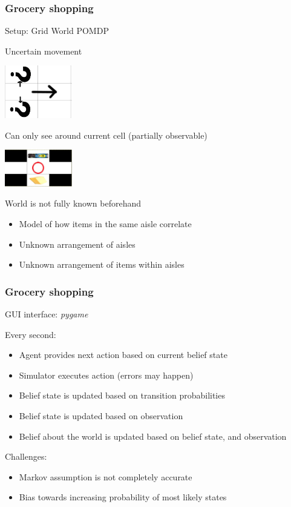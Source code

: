 \documentclass[10pt, compress]{beamer}
\begin{document}
\begin{frame}[fragile]
  \frametitle{Grocery shopping}

  Setup: Grid World POMDP

  Uncertain movement

  \centerline{\includegraphics[width=0.22\textwidth]{img/uncertain_transition.png}}

  Can only see around current cell (partially observable)

  \centerline{\includegraphics[width=0.22\textwidth]{img/partial_obs.png}}

  World is not fully known beforehand
  \begin{itemize}
  \item Model of how items in the same aisle correlate
  \item Unknown arrangement of aisles
  \item Unknown arrangement of items within aisles
  \end{itemize}
\end{frame}

\begin{frame}[fragile]
  \frametitle{Grocery shopping}

  GUI interface: {\it pygame}

  Every second:
  \begin{itemize}
  \item Agent provides next action based on current belief state
  \item Simulator executes action (errors may happen)
  \item Belief state is updated based on transition probabilities
  \item Belief state is updated based on observation
  \item Belief about the world is updated based on belief state, and observation
  \end{itemize}

  Challenges:
  \begin{itemize}
  \item Markov assumption is not completely accurate
  \item Bias towards increasing probability of most likely states
  \end{itemize}
\end{frame}
\end{document}
